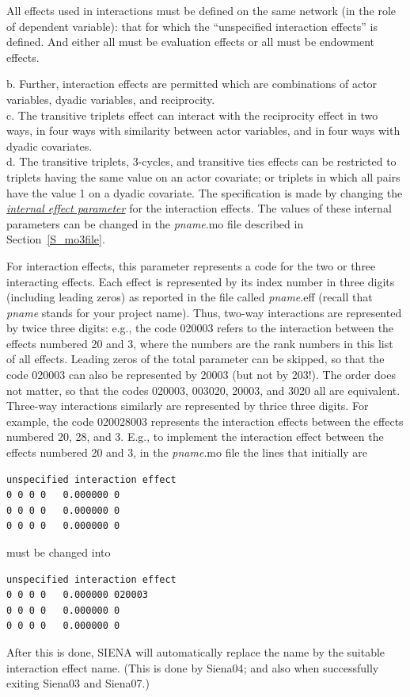 \documentclass[a4paper,fleqn]{article}
\newcommand{\+}{\, + \,}
\newcommand{\SI}{{\sf SIENA }}
\begin{document}
{All effects used in interactions must be defined on the same network
(in the role of dependent variable): that for
which the ``unspecified
interaction effects'' is defined.  And either all must be evaluation effects or
all must be endowment effects.
\iffalse

  b. Further, interaction effects are permitted
  which are combinations of actor variables, dyadic variables, and reciprocity.\\
  c. The transitive triplets effect can interact with the reciprocity effect in two ways,
  in four ways with similarity between actor variables, and in four ways with dyadic covariates.\\
  d. The transitive triplets, 3-cycles, and transitive ties effects
  can be restricted to triplets having the same value on an actor covariate;
  or triplets in which all pairs have the value 1 on a dyadic covariate.
The specification is made by changing the
\hyperlink{T_effpar}{\emph{internal effect parameter}}
for the interaction effects.
The values of these internal parameters
can be changed in the \textsf{{\em pname}.mo} file
described in Section~\ref{S_mo3file}.

For interaction effects, this parameter represents a code
for the two or three interacting effects.
Each effect is represented by its index number
in three digits (including leading zeros)
as reported in the file called \textsf{{\em pname}.eff}
(recall that \textsf{{\em pname}} stands for your project name).
Thus, two-way interactions are represented by twice three digits: e.g., the code 020003
refers to the interaction between the effects numbered 20 and 3,
where the numbers are the rank numbers in this list of all effects.
Leading zeros of the total parameter can be skipped, so that the code 020003
can also be represented by 20003 (but not by 203!). The order does not matter, so that
the codes 020003, 003020, 20003, and 3020 all are equivalent.
Three-way interactions similarly are represented by thrice three digits.
For example, the code 020028003 represents the interaction effects
between the effects numbered 20, 28, and 3.
E.g., to implement the interaction effect between the effects numbered 20 and 3,
in the \textsf{{\em pname}.mo} file the lines that initially are
\begin{verbatim}
unspecified interaction effect
0 0 0 0   0.000000 0
0 0 0 0   0.000000 0
0 0 0 0   0.000000 0
\end{verbatim}
must be changed into
\begin{verbatim}
unspecified interaction effect
0 0 0 0   0.000000 020003
0 0 0 0   0.000000 0
0 0 0 0   0.000000 0
\end{verbatim}
After this is done, \SI will automatically replace the name
by the suitable interaction effect name.
(This is done by \textsf{Siena04};
and also when successfully exiting \textsf{Siena03} and \textsf{Siena07}.)
\medskip

}
\end{document}
